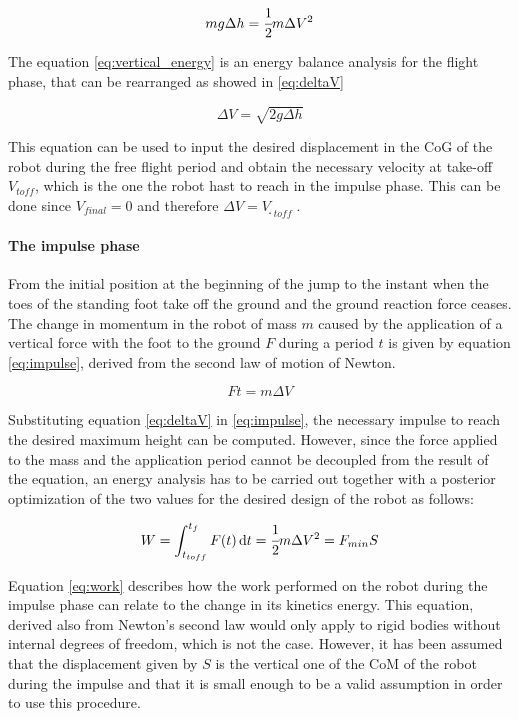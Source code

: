 
\begin{equation}
\label{eq:vertical_energy}
	m g \Delta h = \cfrac{1}{2} m \Delta V^2
\end{equation}

The equation \ref{eq:vertical_energy} is an energy balance analysis for the flight phase, that can be rearranged as showed in \ref{eq:deltaV}

\begin{equation}
\label{eq:deltaV}
	\Delta V = \sqrt{2 g \Delta h}
\end{equation}

This equation can be used to input the desired displacement in the CoG of the robot during the free flight period and obtain the necessary velocity at take-off $V_{toff}$, which is the one the robot hast to reach in the impulse phase.
This can be done since $V_{final} = 0$ and therefore $\Delta V = Ṿ_{toff}$.

\paragraph{The impulse phase}
From the initial position at the beginning of the jump to the instant when the toes of the standing foot take off the ground and the ground reaction force ceases.
The change in momentum in the robot of mass $m$ caused by the application of a vertical force with the foot to the ground $F$ during a period $t$ is given by equation \ref{eq:impulse}, derived from the second law of motion of Newton.


\begin{equation}
\label{eq:impulse}
	F  t = m  \Delta V	
\end{equation} 

Substituting equation \ref{eq:deltaV} in \ref{eq:impulse}, the necessary impulse to reach the desired maximum height can be computed.
However, since the force applied to the mass and the application period cannot be decoupled from the result of the equation, an energy analysis has to be carried out together with a posterior optimization of the two values for the desired design of the robot as follows:

\begin{equation}
\label{eq:work}
	W = \int_{t_{toff}}^{t_{f}} F(t)\,\mathrm{d}t = \cfrac{1}{2} m \Delta V^2 = F_{min} S
\end{equation}

Equation \ref{eq:work} describes how the work performed on the robot during the impulse phase can relate to the change in its kinetics energy. 
This equation, derived also from Newton's second law would only apply to rigid bodies without internal degrees of freedom, which is not the case.
However, it has been assumed that the displacement given by $S$ is the vertical one of the CoM of the robot during the impulse and that it is small enough to be a valid assumption in order to use this procedure.



